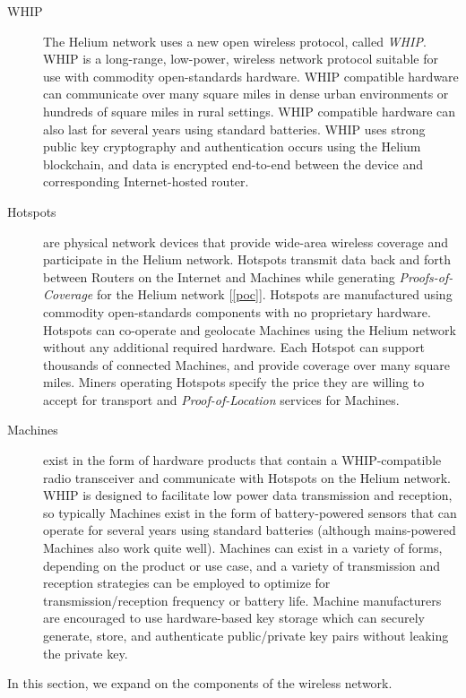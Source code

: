 \documentclass[10pt, nonatbib, nocopyrightspace, reprint]{sigplanconf}
\newcommand{\secref}[1]{[\autoref{#1}]}
\begin{document}
\begin{description}
    \item [WHIP] The Helium network uses a new open wireless protocol, called \emph{WHIP}. WHIP is a long-range, low-power, wireless network protocol suitable for use with commodity open-standards hardware. WHIP compatible hardware can communicate over many square miles in dense urban environments or hundreds of square miles in rural settings. WHIP compatible hardware can also last for several years using standard batteries. WHIP uses strong public key cryptography and authentication occurs using the Helium blockchain, and data is encrypted end-to-end between the device and corresponding Internet-hosted router.

    \item [Hotspots] are physical network devices that provide wide-area wireless coverage and participate in the Helium network. Hotspots transmit data back and forth between Routers on the Internet and Machines while generating \emph{Proofs-of-Coverage} for the Helium network \secref{poc}. Hotspots are manufactured using commodity open-standards components with no proprietary hardware. Hotspots can co-operate and geolocate Machines using the Helium network without any additional required hardware. Each Hotspot can support thousands of connected Machines, and provide coverage over many square miles. Miners operating Hotspots specify the price they are willing to accept for transport and \emph{Proof-of-Location} services for Machines.

    \item [Machines] exist in the form of hardware products that contain a WHIP-compatible radio transceiver and communicate with Hotspots on the Helium network. WHIP is designed to facilitate low power data transmission and reception, so typically Machines exist in the form of battery-powered sensors that can operate for several years using standard batteries (although mains-powered Machines also work quite well). Machines can exist in a variety of forms, depending on the product or use case, and a variety of transmission and reception strategies can be employed to optimize for transmission/reception frequency or battery life. Machine manufacturers are encouraged to use hardware-based key storage which can securely generate, store, and authenticate public/private key pairs without leaking the private key.
\end{description}

In this section, we expand on the components of the wireless network.
\end{document}
